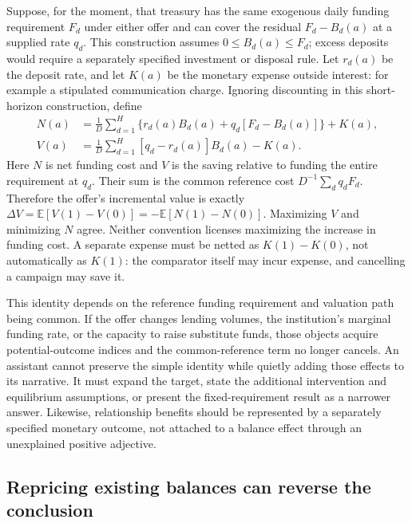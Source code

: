 Suppose, for the moment, that treasury has the same exogenous daily funding
requirement $F_d$ under either offer and can cover the residual $F_d-B_d(a)$
at a supplied rate $q_d$. This construction assumes $0\leq B_d(a)\leq F_d$; excess deposits would require a separately specified investment or disposal rule. Let $r_d(a)$ be the deposit rate, and let $K(a)$ be
the monetary expense outside interest: for example a stipulated communication
charge. Ignoring discounting in this short-horizon construction, define
\begin{align}
 N(a)&=\frac1D\sum_{d=1}^H
 \{r_d(a)B_d(a)+q_d[F_d-B_d(a)]\}+K(a),
 \label{exec17:l2-cost}\\
 V(a)&=\frac1D\sum_{d=1}^H[q_d-r_d(a)]B_d(a)-K(a).
 \label{exec17:l2-value}
\end{align}
Here $N$ is net funding cost and $V$ is the saving relative to funding the
entire requirement at $q_d$. Their sum is the common reference cost
$D^{-1}\sum_d q_dF_d$. Therefore the offer's incremental value is exactly
$\Delta V=\mathbb E[V(1)-V(0)]=-\mathbb E[N(1)-N(0)]$.
Maximizing $V$ and minimizing $N$ agree. Neither convention licenses
maximizing the increase in funding cost. A separate expense must be netted
as $K(1)-K(0)$, not automatically as $K(1)$: the comparator itself may incur
expense, and cancelling a campaign may save it.

This identity depends on the reference funding requirement and valuation
path being common. If the offer changes lending volumes, the institution's
marginal funding rate, or the capacity to raise substitute funds, those
objects acquire potential-outcome indices and the common-reference term no
longer cancels. An assistant cannot preserve the simple identity while
quietly adding those effects to its narrative. It must expand the target,
state the additional intervention and equilibrium assumptions, or present
the fixed-requirement result as a narrower answer. Likewise, relationship
benefits should be represented by a separately specified monetary outcome,
not attached to a balance effect through an unexplained positive adjective.

\subsection{Repricing existing balances can reverse the conclusion}


